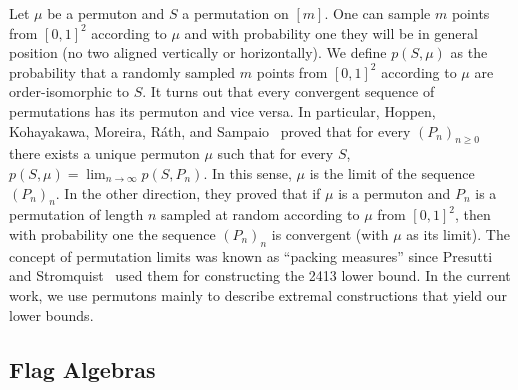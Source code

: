 \documentclass[12pt, a4paper, twoside]{report}
\begin{document}
Let $\mu$ be a permuton and $S$ a permutation on $[m]$. One can sample $m$ points from $[0,1]^2$ according to $\mu$ and with probability one they will be in general position (no two aligned vertically or horizontally). We define $p(S,\mu)$ as the probability that a randomly sampled $m$ points from $[0,1]^2$ according to $\mu$ are order-isomorphic to $S$. It turns out that every convergent sequence of permutations has its permuton and vice versa. In particular, Hoppen, Kohayakawa, Moreira, R\'{a}th, and Sampaio~\cite{hoppen2013permlimits} proved that for every $(P_n)_{n\geq 0}$ there exists a unique permuton $\mu$ such that for every $S$, $p(S,\mu) = \lim_{n\to\infty}p(S,P_n)$. In this sense, $\mu$ is the limit of the sequence $(P_n)_n$. In the other direction, they proved that if $\mu$ is a permuton and $P_n$ is a permutation of length $n$ sampled at random according to $\mu$ from $[0,1]^2$, then with probability one the sequence $(P_n)_n$ is convergent (with $\mu$ as its limit). The concept of permutation limits was known as ``packing measures'' since Presutti and Stromquist~\cite{presutti2010packing} used them for constructing the 2413 lower bound. In the current work, we use permutons mainly to describe extremal constructions that yield our lower bounds. 


\subsection{Flag Algebras}
\label{sec:FA}
\end{document}
